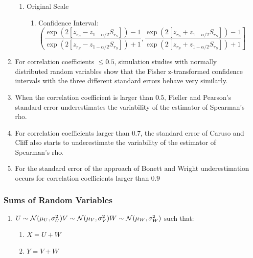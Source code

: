 \begin{enumerate}[itemsep=0.2cm]
\begin{enumerate}[itemsep=0.2cm]
        \item Original Scale
        \begin{enumerate}[itemsep=0.2cm]
            \item Confidence Interval:
            $\left(
                \dfrac{
                    \exp(2[z_{r_S} - z_{1 - \alpha/2}S_{r_S}]) - 1
                }{
                    \exp(2[z_{r_S} - z_{1 - \alpha/2}S_{r_S}]) + 1
                },
                \dfrac{
                    \exp(2[z_{r_S} + z_{1 - \alpha/2}S_{r_S}]) - 1
                }{
                    \exp(2[z_{r_S} + z_{1 - \alpha/2}S_{r_S}]) + 1
                }
            \right]$
        \end{enumerate}

    \end{enumerate}

    \item For correlation coefficients $\leq 0.5$, simulation studies with normally distributed random variables show that the Fisher z-transformed confidence intervals with the three different standard errors behave very similarly.

    \item When the correlation coefficient is larger than $0.5$, Fieller and Pearson’s standard error underestimates the variability of the estimator of Spearman’s rho. 

    \item For correlation coefficients larger than $0.7$, the standard error of Caruso and Cliff also starts to underestimate the variability of the estimator of Spearman’s rho.

    \item For the standard error of the approach of Bonett and Wright underestimation occurs for correlation coefficients larger than $0.9$
\end{enumerate}


\subsubsection{Sums of Random Variables \cite{ism-1}} \label{Normal distribution: Bivariate/ Multivariate: Sums of Random Variables}

\begin{enumerate}[itemsep=0.2cm]
    \item $
        \hfill
        U \sim \mathcal{N}(\mu_U, \sigma_U^2)
        \hfill
        V \sim \mathcal{N}(\mu_V, \sigma_V^2)
        \hfill
        W \sim \mathcal{N}(\mu_W, \sigma_W^2)
        \hfill
    $ such that:
    \begin{enumerate}
        \item $X = U + W$
        \item $Y = V + W$
    \end{enumerate}

\end{enumerate}

